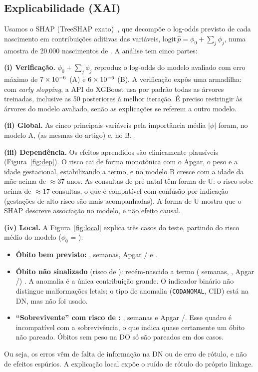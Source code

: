 \documentclass[12pt]{article}
\begin{document}
\subsection{Explicabilidade (XAI)}

Usamos o SHAP (TreeSHAP exato)~\cite{lundberg2017}, que decompõe o log-odds previsto de cada nascimento em contribuições aditivas das variáveis, $\mathrm{logit}\,\hat p = \phi_0 + \sum_j \phi_j$, numa amostra de 20.000 nascimentos de \anoTeste{}. A análise tem cinco partes:

\textbf{(i) Verificação.} $\phi_0 + \sum_j \phi_j$ reproduz o log-odds do modelo avaliado com erro máximo de $7\times 10^{-6}$ (A) e $6\times 10^{-6}$ (B). A verificação expôs uma armadilha: com \textit{early stopping}, a API do XGBoost usa por padrão todas as árvores treinadas, inclusive as 50 posteriores à melhor iteração. É preciso restringir às árvores do modelo avaliado, senão as explicações se referem a outro modelo.

\textbf{(ii) Global.} As cinco principais variáveis pela importância média $|\phi|$ foram, no modelo A, \shapTopA{} (as mesmas do artigo) e, no B, \shapTopB{}.

\textbf{(iii) Dependência.} Os efeitos aprendidos são clinicamente plausíveis (Figura~\ref{fig:dep}). O risco cai de forma monotônica com o Apgar, o peso e a idade gestacional, estabilizando a termo, e no modelo B cresce com a idade da mãe acima de $\approx$37 anos. As consultas de pré-natal têm forma de U: o risco sobe acima de $\approx$17 consultas, o que é compatível com confusão por indicação (gestações de alto risco são mais acompanhadas). A forma de U mostra que o SHAP descreve associação no modelo, e não efeito causal.

\textbf{(iv) Local.} A Figura~\ref{fig:local} explica três casos do teste, partindo do risco médio do modelo ($\phi_0$ = \xaiBase{}): \begin{itemize}
  \item \textbf{Óbito bem previsto:} \xaiVpPeso{}, \xaiVpSem{} semanas, Apgar \xaiVpApgarUm{}/\xaiVpApgarCinco{} e \xaiVpAnom{}.
  \item \textbf{Óbito não sinalizado} (risco de \xaiFnProb{}): recém-nascido a termo (\xaiFnSem{} semanas, \xaiFnPeso{}, Apgar \xaiFnApgarUm{}/\xaiFnApgarCinco{}) \xaiFnAnom{}. A anomalia é a única contribuição grande. O indicador binário não distingue malformações letais; o tipo de anomalia (\texttt{CODANOMAL}, CID) está na DN, mas não foi usado.
  \item \textbf{``Sobrevivente'' com risco de \xaiFpProb{}:} \xaiFpPeso{}, \xaiFpSem{} semanas e Apgar \xaiFpApgarUm{}/\xaiFpApgarCinco{}. Esse quadro é incompatível com a sobrevivência, o que indica quase certamente um óbito não pareado. Óbitos sem peso na DO só são pareados em \linkPesoAus{} dos casos.
\end{itemize}
Ou seja, os erros vêm de falta de informação na DN ou de erro de rótulo, e não de efeitos espúrios. A explicação local expõe o ruído de rótulo do próprio linkage.
\end{document}
